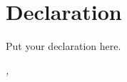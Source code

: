 \chapter*{Declaration}
\thispagestyle{empty}
Put your declaration here.
\bigskip

\noindent\textit{\myLocation, \myTime}

\smallskip

